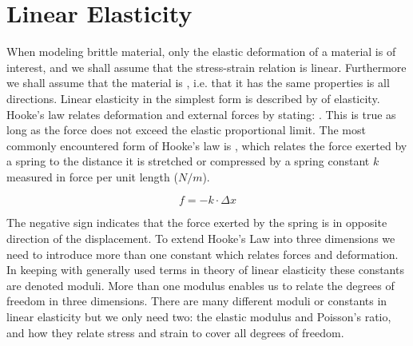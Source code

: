 \section{Linear Elasticity}
\label{sec:elasticity}
%
When modeling brittle material, only the elastic
deformation of a material is of interest, and we shall assume that the
stress-strain relation is linear. Furthermore we shall assume that the
material is , i.e. that it has the same properties is
all directions.
%
Linear elasticity in the simplest form is described by 
 of elasticity. Hooke's law relates deformation and
external forces by stating: . This is
true as long as the force does not exceed the elastic proportional
limit. The most commonly encountered form of Hooke's law is , which relates the force exerted by a spring to the
distance it is stretched or compressed by a spring constant $k$
measured in force per unit length ($N/m$). 

\begin{equation}
\label{eq:hooks_law}
    f = -k \cdot \Delta x
\end{equation}

The negative sign indicates that the force exerted by the spring is in
opposite direction of the displacement.
%
To extend Hooke's Law into three dimensions we need to introduce more
than one constant which relates forces and deformation. In keeping
with generally used terms in theory of linear elasticity these
constants are denoted moduli.
%
%
More than one modulus enables us to relate the degrees of freedom in
three dimensions. There are many different moduli or constants in linear
elasticity but we only need two: the elastic modulus and Poisson's ratio,
and how they relate stress and strain to cover all degrees of freedom.

